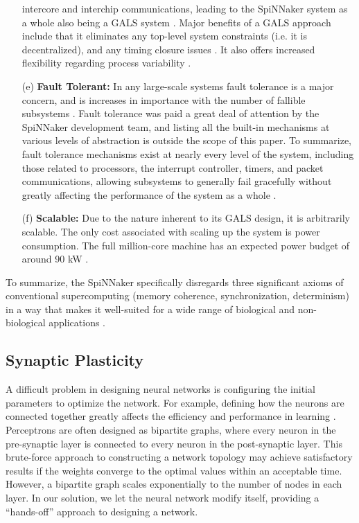 \documentclass[journal]{./sty/IEEEtran}
\begin{document}
\begin{itemize}
intercore and interchip communications, leading to the SpiNNaker system as a whole also 
being a GALS system \cite{BioMPA:Furber}. 
Major benefits of a GALS approach include that it eliminates any top-level 
system constraints (i.e. it is decentralized), 
and any timing closure issues \cite{GALS:Plana}. 
It also offers increased flexibility regarding process variability \cite{BioMPA:Furber}.
\item[(e)]{\bf Fault Tolerant:} In any large-scale systems fault tolerance is a major concern, and is increases in importance 
with the number of fallible subsystems \cite{ArchOverV:Furber}.
Fault tolerance was paid a great deal of attention by the SpiNNaker development team, 
and listing all the built-in mechanisms at various levels of abstraction is outside the scope 
of this paper. 
To summarize, fault tolerance mechanisms exist at nearly every level of the system, 
including those related to processors, 
the interrupt controller, timers, and packet communications, 
allowing subsystems to generally fail gracefully without greatly affecting 
the performance of the system as a whole \cite{ArchOverV:Furber}.
\item[(f)]{\bf Scalable:} Due to the nature inherent to its GALS design, it is arbitrarily scalable. 
The only cost associated with scaling up the system is power consumption. 
The full million-core machine has an expected power budget of around 90 kW \cite{ArchOverV:Furber}.
\end{itemize}

To summarize, the SpiNNaker specifically disregards three significant axioms of conventional supercomputing (memory coherence, synchronization, determinism) in a way that makes it well-suited for a wide range of biological and non-biological applications \cite{ArchOverV:Furber}.

\subsection{Synaptic Plasticity}
A difficult problem in designing neural networks is configuring the initial parameters to optimize the network.
For example, defining how the neurons are connected together greatly affects the efficiency and performance in learning \cite{SynGen:Levy}.
Perceptrons are often designed as bipartite graphs, where every neuron in the pre-synaptic layer is connected to every neuron in the post-synaptic layer.
This brute-force approach to constructing a network topology may achieve satisfactory results if the weights converge to the optimal values within an acceptable time.
However, a bipartite graph scales exponentially to the number of nodes in each layer. 
In our solution, we let the neural network modify itself, providing a ``hands-off'' approach to designing a network.
\end{document}
